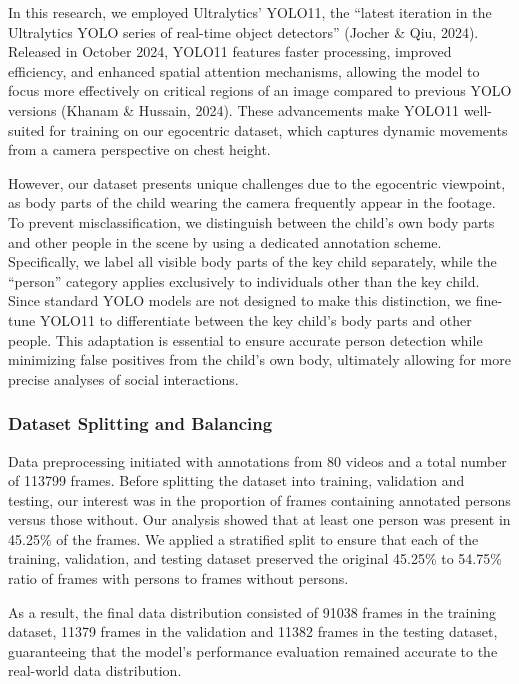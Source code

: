 \documentclass[
  man,floatsintext]{apa6}
\begin{document}
In this research, we employed Ultralytics' YOLO11, the ``latest iteration in the Ultralytics YOLO series of real-time object detectors'' (Jocher \& Qiu, 2024). Released in October 2024, YOLO11 features faster processing, improved efficiency, and enhanced spatial attention mechanisms, allowing the model to focus more effectively on critical regions of an image compared to previous YOLO versions (Khanam \& Hussain, 2024). These advancements make YOLO11 well-suited for training on our egocentric dataset, which captures dynamic movements from a camera perspective on chest height.

However, our dataset presents unique challenges due to the egocentric viewpoint, as body parts of the child wearing the camera frequently appear in the footage. To prevent misclassification, we distinguish between the child's own body parts and other people in the scene by using a dedicated annotation scheme. Specifically, we label all visible body parts of the key child separately, while the ``person'' category applies exclusively to individuals other than the key child. Since standard YOLO models are not designed to make this distinction, we fine-tune YOLO11 to differentiate between the key child's body parts and other people. This adaptation is essential to ensure accurate person detection while minimizing false positives from the child's own body, ultimately allowing for more precise analyses of social interactions.

\subsubsection{Dataset Splitting and Balancing}\label{dataset-splitting-and-balancing}

Data preprocessing initiated with annotations from 80 videos and a total number of 113799 frames. Before splitting the dataset into training, validation and testing, our interest was in the proportion of frames containing annotated persons versus those without. Our analysis showed that at least one person was present in 45.25\% of the frames. We applied a stratified split to ensure that each of the training, validation, and testing dataset preserved the original 45.25\% to 54.75\% ratio of frames with persons to frames without persons.

As a result, the final data distribution consisted of 91038 frames in the training dataset, 11379 frames in the validation and 11382 frames in the testing dataset, guaranteeing that the model's performance evaluation remained accurate to the real-world data distribution.
\end{document}
